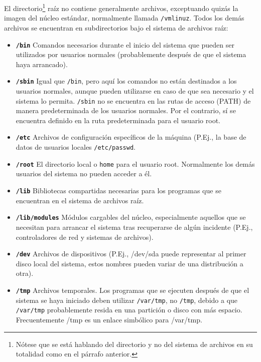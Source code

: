 \documentclass[12pt]{article}
\begin{document}
 El directorio\footnote{Nótese que se está hablando del directorio y no del 
sistema de archivos en su totalidad como en el párrafo anterior.} raíz no 
contiene generalmente archivos, exceptuando quizás
la imagen del núcleo estándar, normalmente llamada
\texttt{/vmlinuz}. Todos los demás archivos se encuentran en
subdirectorios bajo el sistema de archivos raíz:

\begin{itemize} 

	\item \textbf{\texttt{/bin}}
	 Comandos necesarios durante el inicio del sistema que
	pueden ser utilizados por usuarios normales (probablemente después de
	que el sistema haya arrancado).  

	\item \textbf{\texttt{/sbin}}
	 Igual que \texttt{/bin}, pero aquí los
	comandos no están destinados a los usuarios normales, aunque
	pueden utilizarse en caso de que sea necesario y el sistema lo permita.
	\texttt{/sbin} no se encuentra en las rutas de acceso (PATH) de manera 
	predeterminada de los usuarios normales. Por el contrario, sí se 
	encuentra definido en la ruta predeterminada para el usuario root.
	
	\item \textbf{\texttt{/etc}}
	 Archivos de configuración específicos de la máquina (P.Ej., la base
	de datos de usuarios locales \texttt{/etc/passwd}.
	
	\item \textbf{\texttt{/root}}
	 El directorio local o \texttt{home} para el usuario root.  Normalmente
	los demás usuarios del sistema no pueden acceder a él.
	
	\item \textbf{\texttt{/lib}}
	 Bibliotecas compartidas necesarias para los programas que
	se encuentran en el sistema de archivos raíz.
	
	\item \textbf{\texttt{/lib/modules}}
	 Módulos cargables del núcleo, especialmente
	aquellos que se necesitan para arrancar el sistema tras recuperarse
	de algún incidente (P.Ej., controladores de red y sistemas de
	archivos).

	\item \textbf{\texttt{/dev}}
	 Archivos de dispositivos (P.Ej., /dev/sda puede representar al primer
	disco local del sistema, estos nombres pueden variar de una distribución
	a otra).

	\item \textbf{\texttt{/tmp}}
	 Archivos temporales. Los programas que se ejecuten
	después de que el sistema se haya iniciado deben utilizar
	\texttt{/var/tmp}, no \texttt{/tmp},
	debido a que \texttt{/var/tmp} probablemente resida en una
	partición o disco con más espacio. Frecuentemente /tmp es un enlace
	simbólico para /var/tmp.  


\end{itemize}
\end{document}
